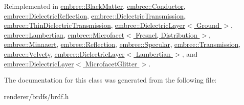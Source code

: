 Reimplemented in \hyperlink{classembree_1_1_black_matter_a0955e03be1befc21396eee1c1bf66d8b}{embree::BlackMatter}, \hyperlink{classembree_1_1_conductor_ac5b0f13023ecafedbe97816939c937f8}{embree::Conductor}, \hyperlink{classembree_1_1_dielectric_reflection_a292d787b936ce461323aaa9857b4390b}{embree::DielectricReflection}, \hyperlink{classembree_1_1_dielectric_transmission_ad588706fe4b14c0272db64d9eebde531}{embree::DielectricTransmission}, \hyperlink{classembree_1_1_thin_dielectric_transmission_a16c3d81fce553abe112741189f138e36}{embree::ThinDielectricTransmission}, \hyperlink{classembree_1_1_dielectric_layer_a33f32f84f98c85a68a212b8b6362e7e1}{embree::DielectricLayer$<$ Ground $>$}, \hyperlink{classembree_1_1_lambertian_a99125affac6254680b17fd210f007259}{embree::Lambertian}, \hyperlink{classembree_1_1_microfacet_a9e9f979b2aaaecb899110bd9e9c2f7ef}{embree::Microfacet$<$ Fresnel, Distribution $>$}, \hyperlink{classembree_1_1_minnaert_af68ead9a773b6f55b21dad888870a10d}{embree::Minnaert}, \hyperlink{classembree_1_1_reflection_ac8763a319aba0109e6283b17b64d719c}{embree::Reflection}, \hyperlink{classembree_1_1_specular_a1386f2ba135c410b176d07dd4e3c6a42}{embree::Specular}, \hyperlink{classembree_1_1_transmission_aa22d7761c728167e6aa009dde0bd6f53}{embree::Transmission}, \hyperlink{classembree_1_1_velvety_a3307cabb2d5faae142034856813b5c73}{embree::Velvety}, \hyperlink{classembree_1_1_dielectric_layer_a33f32f84f98c85a68a212b8b6362e7e1}{embree::DielectricLayer$<$ Lambertian $>$}, and \hyperlink{classembree_1_1_dielectric_layer_a33f32f84f98c85a68a212b8b6362e7e1}{embree::DielectricLayer$<$ MicrofacetGlitter $>$}.



The documentation for this class was generated from the following file:\begin{DoxyCompactItemize}
\item 
renderer/brdfs/brdf.h\end{DoxyCompactItemize}
